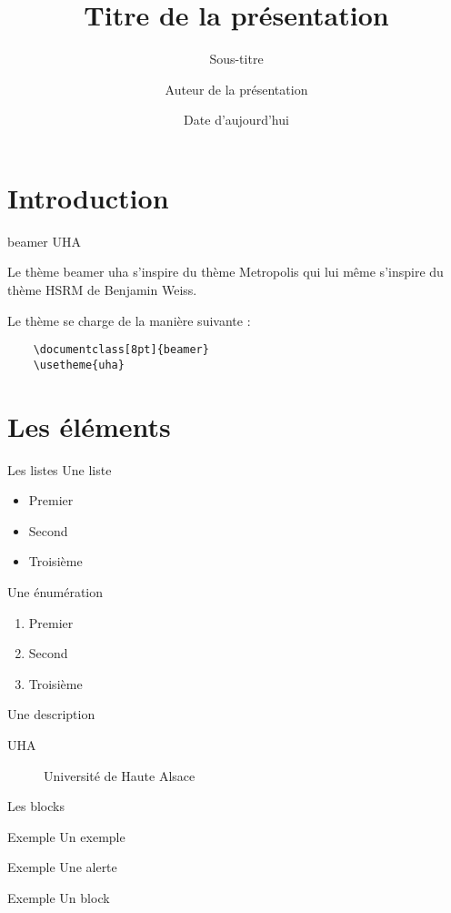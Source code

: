 \documentclass[8pt]{beamer}
\title{Titre de la présentation}
\subtitle{Sous-titre}
\date{Date d'aujourd'hui}
\author{Auteur de la présentation}
\institute{Université de Haute Alsace}
\begin{document}
\begin{frame}
	\titlepage
\end{frame}

\section{Introduction}

\begin{frame}[fragile]{beamer UHA}
	
	Le thème beamer uha s'inspire du thème Metropolis qui lui même s'inspire du thème HSRM de Benjamin Weiss.

	Le thème se charge de la manière suivante :

	\begin{verbatim}
	\documentclass[8pt]{beamer}
	\usetheme{uha}
	\end{verbatim}
\end{frame}


\section{Les éléments}

\begin{frame}{Les listes}
	Une liste
	\begin{itemize}
		\item Premier
		\item Second
		\item Troisième
	\end{itemize}

	Une énumération
	\begin{enumerate}
		\item Premier
		\item Second
		\item Troisième
	\end{enumerate}

	Une description
	\begin{description}
		\item [UHA] Université de Haute Alsace
	\end{description}
\end{frame}

\begin{frame}{Les blocks}
	\begin{exampleblock}{Exemple}
		Un exemple
	\end{exampleblock}
	\begin{alertblock}{Exemple}
		Une alerte
	\end{alertblock}
	\begin{block}{Exemple}
		Un block
	\end{block}
\end{frame}
\end{document}
